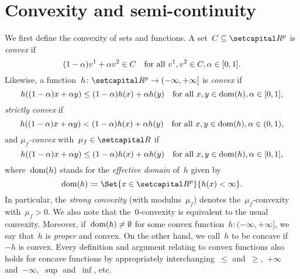 \documentclass[../main]{subfiles}
\begin{document}
\section{Convexity and semi-continuity} 
We first define the convexity of sets and functions.
A set~$C \subseteq \setR^p$ is \emph{convex} if
\begin{equation}
    (1 - \alpha) v^1 + \alpha v^2 \in C \quad \text{for all~$v^1, v^2 \in C, \alpha \in [0, 1]$}
.\end{equation} 
Likewise, a function~$h \colon \setR^p \to (-\infty, +\infty]$ is \emph{convex} if
\begin{equation}
    h((1 - \alpha) x + \alpha y) \le (1 - \alpha) h(x) + \alpha h(y) \quad \text{for all~$x, y \in \operatorname{dom}(h), \alpha \in [0, 1]$}
,\end{equation}
\emph{strictly convex} if
\begin{equation}
    h((1 - \alpha) x + \alpha y) < (1 - \alpha) h(x) + \alpha h(y) \quad \text{for all~$x, y \in \operatorname{dom}(h), \alpha \in (0, 1)$}
,\end{equation} 
and \emph{$\mu_f$-convex} with~$\mu_f \in \setR$ if
\begin{equation}
    h((1 - \alpha) x + \alpha y) \le (1 - \alpha) h(x) + \alpha h(y) \quad \text{for all~$x, y \in \operatorname{dom}(h), \alpha \in [0, 1]$}
,\end{equation} 
where~$\operatorname{dom}(h)$ stands for the \emph{effective domain} of~$h$ given by
\begin{equation}
    \dom(h) \coloneqq \Set{x \in \setR^p}{h(x) < \infty}
.\end{equation} 
In particular, the \emph{strong convexity} (with modulus~$\mu_f$) denotes the~$\mu_f$-convexity with~$\mu_f > 0$.
We also note that the~$0$-convexity is equivalent to the usual convexity.
Moreover, if~$\operatorname{dom}(h) \neq \emptyset$ for some convex function~$h \colon (- \infty, + \infty]$, we say that~$h$ is \emph{proper} and convex.
On the other hand, we call~$h$ to be concave if~$- h$ is convex.
Every definition and argument relating to convex functions also holds for concave functions by appropriately interchanging~$\le$ and~$\ge$,~$+ \infty$ and~$- \infty$,~$\sup$ and~$\inf$, etc.
\end{document}
